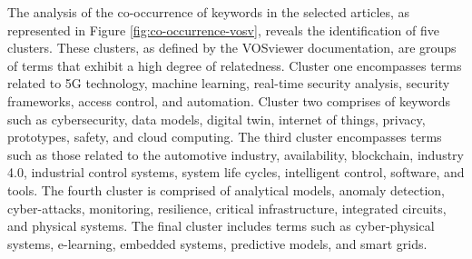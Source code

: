 The analysis of the co-occurrence of keywords in the selected articles, as represented in Figure \ref{fig:co-occurrence-vosv}, reveals the identification of five clusters. These clusters, as defined by the VOSviewer documentation, are groups of terms that exhibit a high degree of relatedness. Cluster one encompasses terms related to 5G technology, machine learning, real-time security analysis, security frameworks, access control, and automation. Cluster two comprises of keywords such as cybersecurity, data models, digital twin, internet of things, privacy, prototypes, safety, and cloud computing. The third cluster encompasses terms such as those related to the automotive industry, availability, blockchain, industry 4.0, industrial control systems, system life cycles, intelligent control, software, and tools. The fourth cluster is comprised of analytical models, anomaly detection, cyber-attacks, monitoring, resilience, critical infrastructure, integrated circuits, and physical systems. The final cluster includes terms such as cyber-physical systems, e-learning, embedded systems, predictive models, and smart grids.